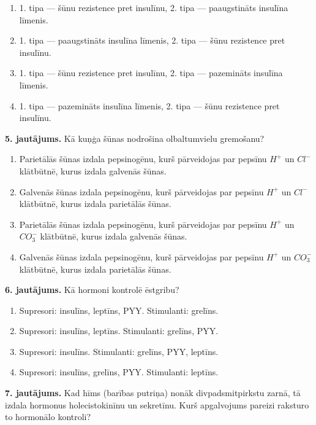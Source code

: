 \documentclass[12pt,a4paper]{article}
\begin{document}
\begin{enumerate}[label=\Alph*.]
    \item  1. tipa — šūnu rezistence pret insulīnu, 2. tipa — paaugstināts insulīna līmenis.
    \item 1. tipa — paaugstināts insulīna līmenis, 2. tipa — šūnu rezistence pret insulīnu. 
    \item 1. tipa — šūnu rezistence pret insulīnu, 2. tipa — pazemināts insulīna līmenis. 
    \item 1. tipa — pazemināts insulīna līmenis, 2. tipa — šūnu rezistence pret insulīnu. 
\end{enumerate}

\noindent \textbf{5. jautājums.} Kā kuņģa šūnas nodrošina olbaltumvielu gremošanu? 

\begin{enumerate}[label=\Alph*.]
    \item Parietālās šūnas izdala pepsinogēnu, kurš pārveidojas par pepsīnu $H^+$ un $Cl^-$ klātbūtnē, kurus izdala galvenās šūnas.
    \item Galvenās šūnas izdala pepsinogēnu, kurš pārveidojas par pepsīnu $H^+$ un $Cl^-$ klātbūtnē, kurus izdala parietālās šūnas. %
    \item Parietālās šūnas izdala pepsinogēnu, kurš pārveidojas par pepsīnu $H^+$ un $CO_3^{-}$ klātbūtnē, kurus izdala galvenās šūnas.
    \item Galvenās šūnas izdala pepsinogēnu, kurš pārveidojas par pepsīnu $H^+$ un $CO_3^{-}$ klātbūtnē, kurus izdala parietālās šūnas.
\end{enumerate}

\noindent \textbf{6. jautājums.} Kā hormoni kontrolē ēstgribu?

\begin{enumerate}[label=\Alph*.]
    \item Supresori: insulīns, leptīns, PYY. Stimulanti: grelīns. 
    \item Supresori: insulīns, leptīns. Stimulanti: grelīns, PYY.
    \item Supresori: insulīns. Stimulanti: grelīns, PYY, leptīns.
    \item Supresori: insulīns, grelīns, PYY. Stimulanti: leptīns.
\end{enumerate}

\noindent \textbf{7. jautājums.} Kad hīms (barības putriņa) nonāk divpadsmitpirkstu zarnā, tā izdala hormonus holecistokinīnu un sekretīnu. Kurš apgalvojums pareizi raksturo to hormonālo kontroli? 
\end{document}
